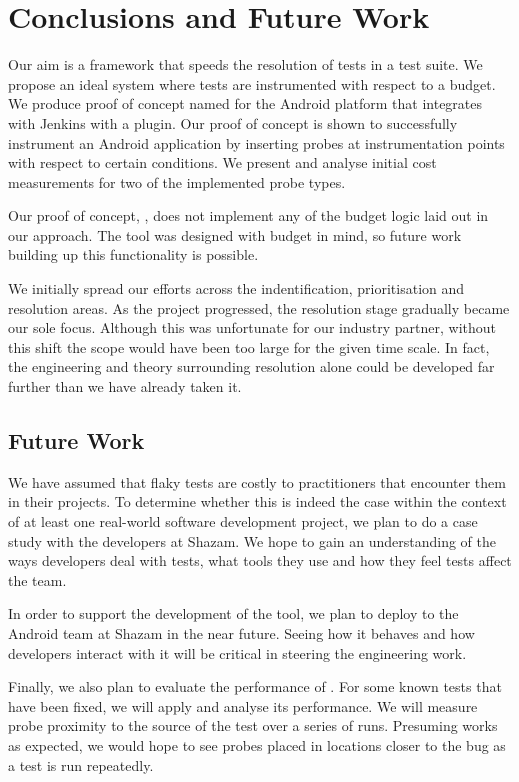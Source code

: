 \section{Conclusions and Future Work}
\label{sec:conc}

Our aim is a framework that speeds the resolution of \flaky tests in a test
suite. We propose an ideal system where tests are instrumented with respect to a
budget. We produce proof of concept named for the Android platform that
integrates with Jenkins with a plugin. Our proof of concept is shown to
successfully instrument an Android application by inserting probes at
instrumentation points with respect to certain conditions. We present and
analyse initial cost measurements for two of the implemented probe types.

Our proof of concept, \venera, does not implement any of the budget logic laid
out in our approach. The tool was designed with budget in mind, so future work
building up this functionality is possible.

We initially spread our efforts across the indentification, prioritisation and
resolution areas. As the project progressed, the resolution stage gradually
became our sole focus. Although this was unfortunate for our industry partner,
without this shift the scope would have been too large for the given time scale.
In fact, the engineering and theory surrounding resolution alone could be
developed far further than we have already taken it.


\subsection{Future Work}
\label{sec:sec:future_work}

We have assumed that flaky tests are costly to practitioners that encounter them
in their projects. To determine whether this is indeed the case within the
context of at least one real-world software development project, we plan to do a
case study with the developers at Shazam. We hope to gain an understanding of
the ways developers deal with \flaky tests, what tools they use and how they
feel \flaky tests affect the team.

In order to support the development of the tool, we plan to deploy \venera to
the Android team at Shazam in the near future. Seeing how it behaves and how
developers interact with it will be critical in steering the engineering work.

Finally, we also plan to evaluate the performance of \venera. For some known
\flaky tests that have been fixed, we will apply \venera and analyse its
performance. We will measure probe proximity to the source of the \flaky test
over a series of runs. Presuming \venera works as expected, we would hope to
see probes placed in locations closer to the bug as a test is run repeatedly.

